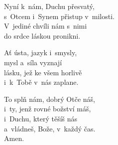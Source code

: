 \begin{translatioMulticol}{3}
Nyní k~nám, Duchu přesvatý,\\
s~Otcem i~Synem přistup v~milosti.\\
V~jediné chvíli nám s~nimi\\
do srdce láskou pronikni.\columnbreak

Ať ústa, jazyk i~smysly,\\
mysl a~síla vyznají\\
lásku, jež ke všem horlivě\\
i~k~Tobě v~nás zaplane.\columnbreak

To splň nám, dobrý Otče náš,\\
i~ty, jenž rovné božství máš,\\
i~Duchu, který těšíš nás\\
a~vládneš, Bože, v~každý čas.\\
Amen.
\end{translatioMulticol}
